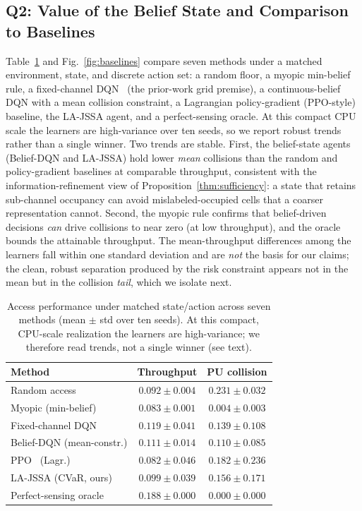 \subsection{Q2: Value of the Belief State and Comparison to Baselines}
Table~\ref{tab:metrics} and Fig.~\ref{fig:baselines} compare seven methods
under a matched environment, state, and discrete action set: a random floor,
a myopic min-belief rule, a fixed-channel DQN~\cite{wang2018} (the prior-work
grid premise), a continuous-belief DQN with a mean collision constraint, a
Lagrangian policy-gradient (PPO-style)~\cite{schulman2017ppo} baseline, the
LA-JSSA agent, and a perfect-sensing oracle. At this compact CPU scale the
learners are high-variance over ten seeds, so we report robust trends rather
than a single winner. Two trends are stable. First, the belief-state agents
(Belief-DQN and LA-JSSA) hold lower \emph{mean} collisions than the random and
policy-gradient baselines at comparable throughput, consistent with the
information-refinement view of Proposition~\ref{thm:sufficiency}: a state that
retains sub-channel occupancy can avoid mislabeled-occupied cells that a
coarser representation cannot. Second, the myopic rule confirms that
belief-driven decisions \emph{can} drive collisions to near zero (at low
throughput), and the oracle bounds the attainable throughput. The
mean-throughput differences among the learners fall within one standard
deviation and are \emph{not} the basis for our claims; the clean, robust
separation produced by the risk constraint appears not in the mean but in the
collision \emph{tail}, which we isolate next.

\begin{table}[t]
\centering
\caption{Access performance under matched state/action across seven methods
(mean $\pm$ std over ten seeds). At this compact, CPU-scale realization the
learners are high-variance; we therefore read trends, not a single winner
(see text).}
\label{tab:metrics}
\begin{tabular}{lcc}
\toprule
Method & Throughput & PU collision \\
\midrule
Random access                     & $0.092\pm0.004$ & $0.231\pm0.032$ \\
Myopic (min-belief)               & $0.083\pm0.001$ & $0.004\pm0.003$ \\
Fixed-channel DQN~\cite{wang2018} & $0.119\pm0.041$ & $0.139\pm0.108$ \\
Belief-DQN (mean-constr.)         & $0.111\pm0.014$ & $0.110\pm0.085$ \\
PPO~\cite{schulman2017ppo} (Lagr.)& $0.082\pm0.046$ & $0.182\pm0.236$ \\
LA-JSSA (CVaR, ours)              & $0.099\pm0.039$ & $0.156\pm0.171$ \\
Perfect-sensing oracle            & $0.188\pm0.000$ & $0.000\pm0.000$ \\
\bottomrule
\end{tabular}
\end{table}

